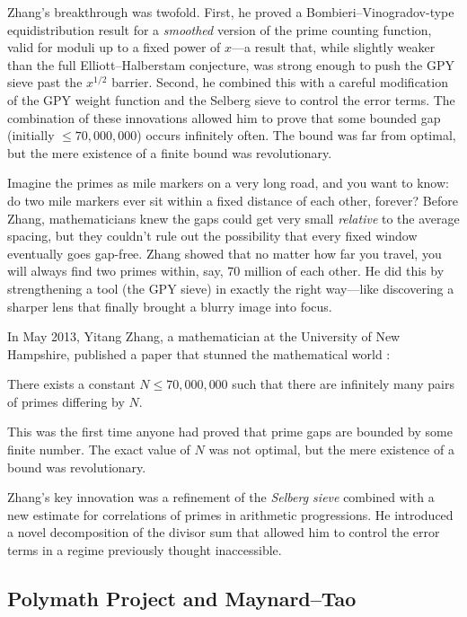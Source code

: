 Zhang's breakthrough was twofold. First, he proved a Bombieri--Vinogradov-type equidistribution result for a \emph{smoothed} version of the prime counting function, valid for moduli up to a fixed power of $x$---a result that, while slightly weaker than the full Elliott--Halberstam conjecture, was strong enough to push the GPY sieve past the $x^{1/2}$ barrier. Second, he combined this with a careful modification of the GPY weight function and the Selberg sieve to control the error terms. The combination of these innovations allowed him to prove that some bounded gap (initially $\leq 70{,}000{,}000$) occurs infinitely often. The bound was far from optimal, but the mere existence of a finite bound was revolutionary.

Imagine the primes as mile markers on a very long road, and you want to know: do two mile markers ever sit within a fixed distance of each other, forever? Before Zhang, mathematicians knew the gaps could get very small \emph{relative} to the average spacing, but they couldn't rule out the possibility that every fixed window eventually goes gap-free. Zhang showed that no matter how far you travel, you will always find two primes within, say, 70 million of each other. He did this by strengthening a tool (the GPY sieve) in exactly the right way---like discovering a sharper lens that finally brought a blurry image into focus.

In May 2013, Yitang Zhang, a mathematician at the University of New Hampshire, published a paper that stunned the mathematical world \cite{zhang2014}:

\begin{theorem}
There exists a constant $N \leq 70,000,000$ such that there are infinitely many pairs of primes differing by $N$.
\end{theorem}

This was the first time anyone had proved that prime gaps are bounded by some finite number. The exact value of $N$ was not optimal, but the mere existence of a bound was revolutionary.

Zhang's key innovation was a refinement of the \emph{Selberg sieve} combined with a new estimate for correlations of primes in arithmetic progressions. He introduced a novel decomposition of the divisor sum that allowed him to control the error terms in a regime previously thought inaccessible.

\subsection{Polymath Project and Maynard--Tao}

